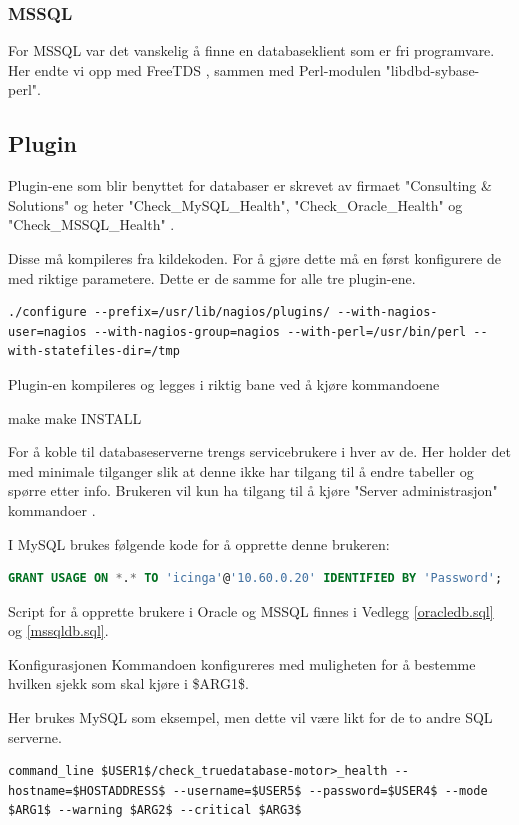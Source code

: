 \subsubsection{MSSQL}
For MSSQL var det vanskelig å finne en databaseklient som er fri programvare. Her endte vi opp med FreeTDS \cite{freetds}, sammen med Perl-modulen "libdbd-sybase-perl".

\subsection{Plugin}
Plugin-ene som blir benyttet for databaser er skrevet av firmaet "Consulting \& Solutions" og heter "Check\_MySQL\_Health", "Check\_Oracle\_Health" og "Check\_MSSQL\_Health" \cite{consol}.

Disse må kompileres fra kildekoden. For å gjøre dette må en først konfigurere de med riktige parametere. Dette er de samme for alle tre plugin-ene.

\begin{lstlisting}
./configure --prefix=/usr/lib/nagios/plugins/ --with-nagios-user=nagios --with-nagios-group=nagios --with-perl=/usr/bin/perl --with-statefiles-dir=/tmp
\end{lstlisting}

Plugin-en kompileres og legges i riktig bane ved å kjøre kommandoene

make
make INSTALL

For å koble til databaseserverne trengs servicebrukere i hver av de. Her holder det med minimale tilganger slik at denne ikke har tilgang til å endre tabeller og spørre etter info. Brukeren vil kun ha tilgang til å kjøre "Server administrasjon" kommandoer \cite{mysqlpriv}.

I MySQL brukes følgende kode for å opprette denne brukeren:
\begin{lstlisting}[language=SQL]
GRANT USAGE ON *.* TO 'icinga'@'10.60.0.20' IDENTIFIED BY 'Password';
\end{lstlisting}

Script for å opprette brukere i Oracle og MSSQL finnes i Vedlegg \ref{oracledb.sql} og \ref{mssqldb.sql}.

Konfigurasjonen
Kommandoen konfigureres med muligheten for å bestemme hvilken sjekk som skal kjøre i \$ARG1\$.

Her brukes MySQL som eksempel, men dette vil være likt for de to andre SQL serverne. 
\begin{lstlisting}
command_line $USER1$/check_truedatabase-motor>_health --hostname=$HOSTADDRESS$ --username=$USER5$ --password=$USER4$ --mode $ARG1$ --warning $ARG2$ --critical $ARG3$
\end{lstlisting}

